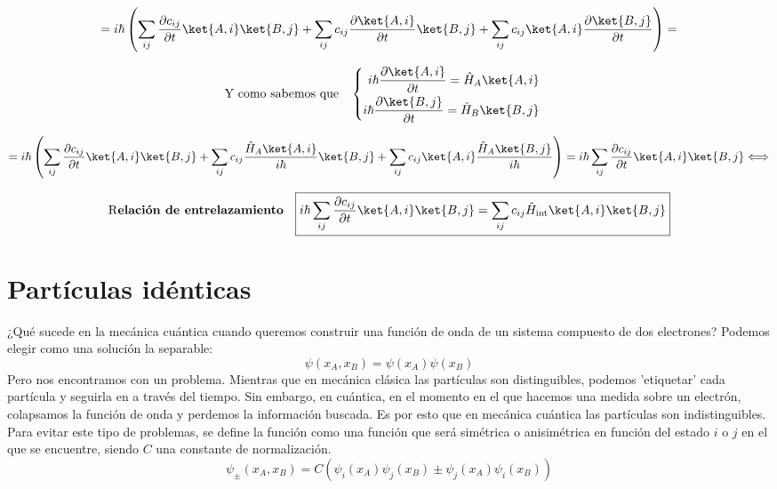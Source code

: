 \documentclass{report}
\begin{document}
    \[=i\hbar\left(\sum_{ij}\dfrac{\partial c_{ij}}{\partial t}\ket{A,i}\ket{B,j}+
    \sum_{ij}c_{ij}\dfrac{\partial\ket{A,i}}{\partial t}\ket{B,j}+\sum_{ij}c_{ij}\ket{A,i}
    \dfrac{\partial \ket{B,j}}{\partial t}\right)=\]
    
    \[\text{Y como sabemos que }\hspace{0.2cm}\begin{cases}
    \begin{aligned}
      i\hbar\dfrac{\partial \ket{A,i}}{\partial t}=\hat{H}_A\ket{A,i}\\
      i\hbar\dfrac{\partial \ket{B,j}}{\partial t}=\hat{H}_B\ket{B,j}
    \end{aligned}
    \end{cases}\]

    \[=i\hbar\left(\sum_{ij}\dfrac{\partial c_{ij}}{\partial t}\ket{A,i}\ket{B,j}+
    \sum_{ij}c_{ij}\dfrac{\hat{H}_A\ket{A,i}}{i\hbar}\ket{B,j}+\sum_{ij}c_{ij}\ket{A,i}
    \dfrac{\hat{H}_A\ket{B,j}}{i\hbar}\right)=i\hbar\sum_{ij}\dfrac{\partial c_{ij}}{\partial t}
    \ket{A,i}\ket{B,j}\Longleftrightarrow\]

    \[\text{R\textbf{elación de entrelazamiento }}\hspace{0.2cm}\boxed{i\hbar\sum_{ij}\dfrac{\partial c_{ij}}{\partial t}\ket{A,i}\ket{B,j}=
    \sum_{ij}c_{ij}\hat{H}_\text{int}\ket{A,i}\ket{B,j}}\]
  \section{Partículas idénticas}
    \noindent ¿Qué sucede en la mecánica cuántica cuando queremos construir una función
    de onda de un sistema compuesto de dos electrones? Podemos elegir como una
    solución la separable:
    \[\psi(x_A,x_B)=\psi(x_A)\psi(x_B)\]
    \noindent Pero nos encontramos con un problema. Mientras que en mecánica clásica las 
    partículas son distinguibles, podemos 'etiquetar' cada partícula y seguirla 
    en a través del tiempo. Sin embargo, en cuántica, en el momento en el que hacemos
    una medida sobre un electrón, colapsamos la función de onda y perdemos la 
    información buscada. Es por esto que en mecánica cuántica las partículas son 
    indistinguibles.\\

    \noindent Para evitar este tipo de problemas, se define la función como una 
    función que será simétrica o anisimétrica en función del estado $i$ o $j$ en 
    el que se encuentre, siendo $C$ una constante de normalización.
    \[\psi_\pm(x_A,x_B)=C\left(\psi_i(x_A)\psi_j(x_B)\pm\psi_j(x_A)\psi_i(x_B)\right)\]
\end{document}
